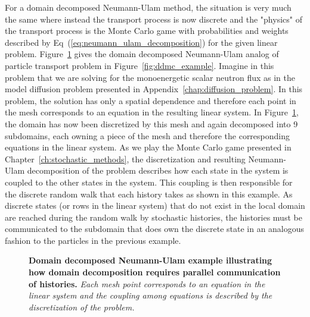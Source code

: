 \documentclass[letterpaper,11pt]{article}
\begin{document}
For a domain decomposed Neumann-Ulam method, the situation is very
much the same where instead the transport process is now discrete and
the "physics" of the transport process is the Monte Carlo game with
probabilities and weights described by
Eq~(\ref{eq:neumann_ulam_decomposition}) for the given linear
problem. Figure~\ref{fig:ddnu_example} gives the domain decomposed
Neumann-Ulam analog of particle transport problem in
Figure~\ref{fig:ddmc_example}. Imagine in this problem that we are
solving for the monoenergetic scalar neutron flux as in the model
diffusion problem presented in Appendix~\ref{chap:diffusion_problem}.
In this problem, the solution has only a spatial dependence and
therefore each point in the mesh corresponds to an equation in the
resulting linear system. In Figure~\ref{fig:ddnu_example}, the domain
has now been discretized by this mesh and again decomposed into 9
subdomains, each owning a piece of the mesh and therefore the
corresponding equations in the linear system. As we play the Monte
Carlo game presented in Chapter~\ref{ch:stochastic_methods}, the
discretization and resulting Neumann-Ulam decomposition of the problem
describes how each state in the system is coupled to the other states
in the system. This coupling is then responsible for the discrete
random walk that each history takes as shown in this example. As
discrete states (or rows in the linear system) that do not exist in
the local domain are reached during the random walk by stochastic
histories, the histories must be communicated to the subdomain that
does own the discrete state in an analogous fashion to the particles
in the previous example.
\begin{figure}[t!]
  \begin{center}
    \scalebox{1.5}{
       }
  \end{center}
  \caption{\textbf{Domain decomposed Neumann-Ulam example illustrating
      how domain decomposition requires parallel communication of
      histories.} \textit{Each mesh point corresponds to an equation
      in the linear system and the coupling among equations is
      described by the discretization of the problem.}}
  \label{fig:ddnu_example}
\end{figure}
\end{document}
